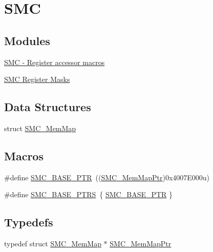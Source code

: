 \hypertarget{group___s_m_c___peripheral}{}\section{S\+MC}
\label{group___s_m_c___peripheral}
\subsection*{Modules}
\begin{DoxyCompactItemize}
\item 
\hyperlink{group___s_m_c___register___accessor___macros}{S\+M\+C -\/ Register accessor macros}
\item 
\hyperlink{group___s_m_c___register___masks}{S\+M\+C Register Masks}
\end{DoxyCompactItemize}
\subsection*{Data Structures}
\begin{DoxyCompactItemize}
\item 
struct \hyperlink{struct_s_m_c___mem_map}{S\+M\+C\+\_\+\+Mem\+Map}
\end{DoxyCompactItemize}
\subsection*{Macros}
\begin{DoxyCompactItemize}
\item 
\#define \hyperlink{group___s_m_c___peripheral_ga31b6c4571795341e6446800243313e56}{S\+M\+C\+\_\+\+B\+A\+S\+E\+\_\+\+P\+TR}~((\hyperlink{group___s_m_c___peripheral_ga763f87a6b8ebab7acb6dde639e6a47c7}{S\+M\+C\+\_\+\+Mem\+Map\+Ptr})0x4007\+E000u)
\item 
\#define \hyperlink{group___s_m_c___peripheral_gae583f3f0917ee513adcac36dd042a5f3}{S\+M\+C\+\_\+\+B\+A\+S\+E\+\_\+\+P\+T\+RS}~\{ \hyperlink{group___s_m_c___peripheral_ga31b6c4571795341e6446800243313e56}{S\+M\+C\+\_\+\+B\+A\+S\+E\+\_\+\+P\+TR} \}
\end{DoxyCompactItemize}
\subsection*{Typedefs}
\begin{DoxyCompactItemize}
\item 
typedef struct \hyperlink{struct_s_m_c___mem_map}{S\+M\+C\+\_\+\+Mem\+Map} $\ast$ \hyperlink{group___s_m_c___peripheral_ga763f87a6b8ebab7acb6dde639e6a47c7}{S\+M\+C\+\_\+\+Mem\+Map\+Ptr}
\end{DoxyCompactItemize}


